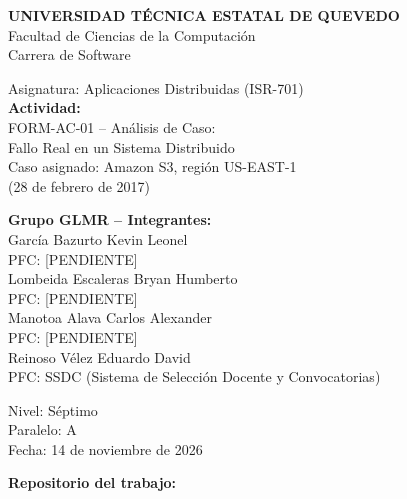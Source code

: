 \documentclass[10pt,a4paper]{article}
\newcommand{\cvLL}{\fontsize{17.28}{21}\selectfont}
\begin{document}
	
	\begin{titlepage}
		\begin{center}
			\fontsize{14.4}{20}\selectfont
			\vspace*{0.3cm}
			{\cvLL\bfseries UNIVERSIDAD T\'ECNICA ESTATAL DE QUEVEDO}\\[6pt]
			Facultad de Ciencias de la Computaci\'on\\[4pt]
			Carrera de Software
			\par\vfill
			
			Asignatura: Aplicaciones Distribuidas (ISR-701)\\[0.8cm]
			{\bfseries Actividad:}\\[4pt]
			FORM-AC-01 -- An\'alisis de Caso:\\
			Fallo Real en un Sistema Distribuido\\[4pt]
			Caso asignado: Amazon S3, regi\'on US-EAST-1\\
			(28 de febrero de 2017)
			\par\vfill
			
			{\bfseries Grupo GLMR -- Integrantes:}\\[6pt]
			Garc\'ia Bazurto Kevin Leonel\\
			{\fontsize{12}{16}\selectfont PFC: {[PENDIENTE]}}\\[6pt]
			Lombeida Escaleras Bryan Humberto\\
			{\fontsize{12}{16}\selectfont PFC: {[PENDIENTE]}}\\[6pt]
			Manotoa Alava Carlos Alexander\\
			{\fontsize{12}{16}\selectfont PFC: {[PENDIENTE]}}\\[6pt]
			Reinoso V\'elez Eduardo David\\
			{\fontsize{12}{16}\selectfont PFC: SSDC (Sistema de Selecci\'on Docente y Convocatorias)}
			\par\vfill
			
			Nivel: S\'eptimo\\[4pt]
			Paralelo: A\\[4pt]
			Fecha: 14 de noviembre de 2026
			\par\vfill
			
			{\bfseries Repositorio del trabajo:}\\[8pt]
			\vspace*{0.3cm}
		\end{center}
	\end{titlepage}
	\restoregeometry
	
\end{document}
